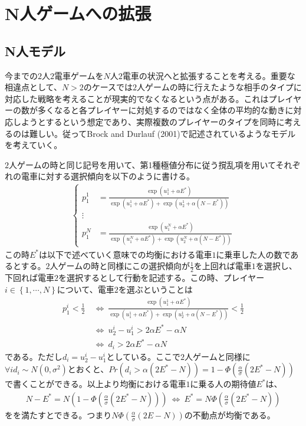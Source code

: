 \documentclass{jsarticle}
\begin{document}
\section{N人ゲームへの拡張}
\subsection{N人モデル}
今までの$2$人$2$電車ゲームを$N$人$2$電車の状況へと拡張することを考える。重要な相違点として、$N > 2$のケースでは$2$人ゲームの時に行えたような相手のタイプに対応した戦略を考えることが現実的でなくなるという点がある。これはプレイヤーの数が多くなると各プレイヤーに対処するのではなく全体の平均的な動きに対応しようとするという想定であり、実際複数のプレイヤーのタイプを同時に考えるのは難しい。従ってBrock and Durlauf (2001)で記述されているようなモデルを考えていく。

$2$人ゲームの時と同じ記号を用いて、第1種極値分布に従う撹乱項を用いてそれぞれの電車に対する選択傾向を以下のように書ける。
\begin{align*}
	\begin{cases}
	p_1^1 &= \frac{\exp(u_1^1 + \alpha E^*)}{\exp(u_1^1 + \alpha E^*) + \exp(u_2^1 + \alpha(N - E^*))}\\[8pt]
	\vdots\\[8pt]
	p_1^N &= \frac{\exp(u_1^N + \alpha E^*)}{\exp(u_1^N + \alpha E^*) + \exp(u_2^N + \alpha(N - E^*))}
	\end{cases}
\end{align*}
この時$E^*$は以下で述べていく意味での均衡における電車$1$に乗車した人の数であるとする。$2$人ゲームの時と同様にこの選択傾向が$\frac{1}{2}$を上回れば電車$1$を選択し、下回れば電車$2$を選択するとして行動を記述する。この時、プレイヤー$i \in \left\{ 1, \cdots, N\right\}$について、電車$2$を選ぶということは
\begin{align*}
	p_1^i < \frac{1}{2}\ &\Leftrightarrow\ \frac{\exp(u_1^1 + \alpha E^*)}{\exp(u_1^1 + \alpha E^*) + \exp(u_2^1 + \alpha(N - E^*))} < \frac{1}{2}\\[8pt]
	&\Leftrightarrow\ u_2^i - u_1^i > 2\alpha E^* - \alpha N\\[8pt]
	&\Leftrightarrow\ d_i > 2\alpha E^* - \alpha N
\end{align*}
である。ただし$d_i = u_2^i - u_1^i$としている。ここで$2$人ゲームと同様に$\forall i d_i \sim N(0,\sigma^2)$とおくと、$Pr(d_i > \alpha(2E^* - N)) = 1 - \Phi \left(\frac{\alpha}{\sigma}(2 E^* - N)\right)$で書くことができる。以上より均衡における電車$1$に乗る人の期待値$ E^*$は、
\begin{align*}
	N - E^* =  N(1 - \Phi \left(\frac{\alpha}{\sigma}(2 E^* - N)\right))\ \Leftrightarrow\  E^* = N\Phi \left(\frac{\alpha}{\sigma}(2 E^* - N)\right)
\end{align*}
をを満たすとできる。つまり$N \Phi \left(\frac{\alpha}{\sigma}(2 E - N)\right)$の不動点が均衡である。
\end{document}
